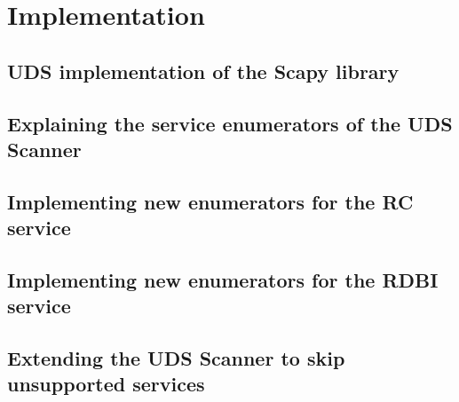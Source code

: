 \section{Implementation}

\subsection{UDS implementation of the Scapy library}
\subsection{Explaining the service enumerators of the UDS Scanner}
\subsection{Implementing new enumerators for the RC service}
\subsection{Implementing new enumerators for the RDBI service}
\subsection{Extending the UDS Scanner to skip unsupported services}
